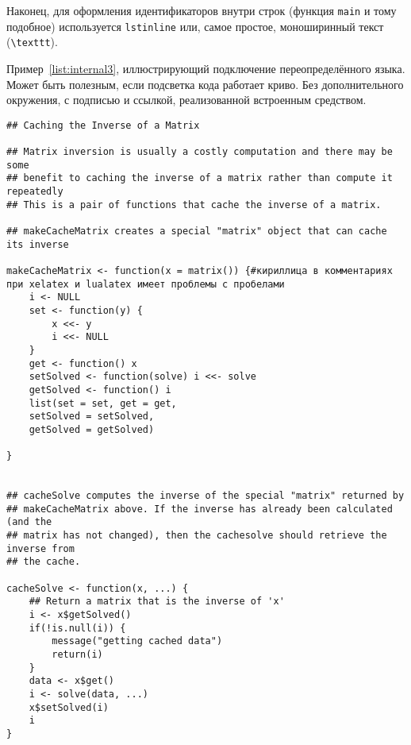 Наконец, для оформления идентификаторов внутри строк
(функция \lstinline{main} и тому подобное) используется
\texttt{lstinline} или, самое простое, моноширинный текст
(\texttt{\textbackslash texttt}).


Пример~\ref{list:internal3}, иллюстрирующий подключение переопределённого языка. Может быть полезным, если подсветка кода работает криво. Без дополнительного окружения, с подписью и ссылкой, реализованной встроенным средством.
\begin{lstlisting}[language={Renhanced},caption={Пример листинга c подписью собственными средствами},label={list:internal3}]
## Caching the Inverse of a Matrix

## Matrix inversion is usually a costly computation and there may be some
## benefit to caching the inverse of a matrix rather than compute it repeatedly
## This is a pair of functions that cache the inverse of a matrix.

## makeCacheMatrix creates a special "matrix" object that can cache its inverse

makeCacheMatrix <- function(x = matrix()) {#кириллица в комментариях при xelatex и lualatex имеет проблемы с пробелами
    i <- NULL
    set <- function(y) {
        x <<- y
        i <<- NULL
    }
    get <- function() x
    setSolved <- function(solve) i <<- solve
    getSolved <- function() i
    list(set = set, get = get,
    setSolved = setSolved,
    getSolved = getSolved)
    
}


## cacheSolve computes the inverse of the special "matrix" returned by
## makeCacheMatrix above. If the inverse has already been calculated (and the
## matrix has not changed), then the cachesolve should retrieve the inverse from
## the cache.

cacheSolve <- function(x, ...) {
    ## Return a matrix that is the inverse of 'x'
    i <- x$getSolved()
    if(!is.null(i)) {
        message("getting cached data")
        return(i)
    }
    data <- x$get()
    i <- solve(data, ...)
    x$setSolved(i)
    i  
}
\end{lstlisting} %

%     






